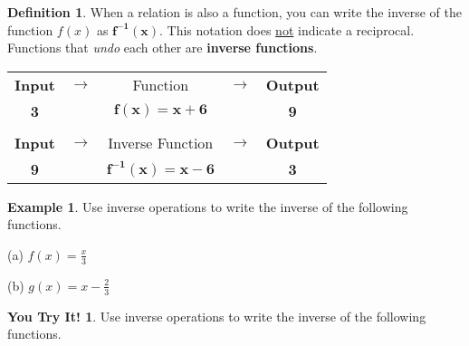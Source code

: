 \documentclass{report}
\theoremstyle{definition}
\newtheorem{example}{\bf Example}
\newtheorem{youtry}{\bf You Try It!}
\newtheorem{definition}{\bf Definition}[section]
\begin{document}
\normalsize
\vfill

 \newpage


\begin{definition}
When a relation is also a function, you can write the inverse of the function $f(x)$ as $\mathbf{f^{-1}(x)}$. This notation does \underline{not} indicate a reciprocal. Functions that \emph{undo} each other are \textbf{inverse functions}.
\end{definition}

\large
\begin{center}
	\begin{tabular}[t]{ccccc}
		\color{blue}\textbf{Input}\color{black}  & $\longrightarrow$ & Function & $\longrightarrow$ & \color{red}\textbf{Output}\color{black} \\
		\color{blue}\textbf{3}\color{black}        & & $\mathbf{f(x)=x+6}$ & & \color{red}\textbf{9}\color{black}\\
		&&&&\\
		\color{red}\textbf{Input}\color{black}  & $\longrightarrow$ & Inverse Function & $\longrightarrow$ & \color{blue}\textbf{Output}\color{black} \\
		\color{red}\textbf{9}\color{black} & & $\mathbf{f^{-1}(x) = x - 6}$ & & \color{blue}\textbf{3}\color{black}\\
	\end{tabular}

\end{center}
\normalsize

%

\begin{example}
Use inverse operations to write the inverse of the following functions.
\end{example}

\begin{minipage}[t]{0.45\linewidth}
(a) $f(x)=\displaystyle\frac{x}{3}$
\end{minipage}
\hfill
\begin{minipage}[t]{0.45\linewidth}
(b) $g(x)=x-\displaystyle\frac{2}{3}$
\end{minipage}
\vfill

%

\begin{youtry}
Use inverse operations to write the inverse of the following functions.
\end{youtry}
\end{document}

